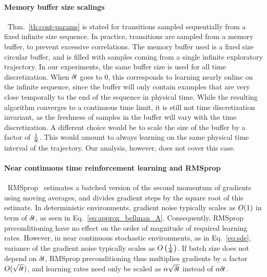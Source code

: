 \paragraph{Memory buffer size scalings}~Thm.~\ref{th:cont-params} is stated for
transitions sampled sequentially from a fixed infinite size sequence. In practice,
transitions are sampled from a memory buffer, to prevent excessive correlations.
The memory buffer used is a fixed size circular buffer, and is
filled with samples coming from a single infinite exploratory trajectory. In
our experiments, the same buffer size is used for all time discretization. When
${\delta\hspace{-.1em}t}$ goes to $0$, this corresponds to learning nearly online on the
infinite sequence, since the buffer will only contain examples that are very
close temporally to the end of the sequence in physical time. While the resulting
algorithm  converges to a continuous time limit, it is still not
time discretization invariant, as the freshness of samples in the buffer will
vary with the time discretization.
A different choice would be to scale the size of the buffer by a factor of
$\frac{1}{{\delta\hspace{-.1em}t}}$. This would amount to always learning on the same physical time interval of
the trajectory. Our analysis, however, does not cover this case.

\paragraph{Near continuous time reinforcement learning and RMSprop}~RMSprop~\cite{rmsprop}
estimates a batched version of the second momentum of gradients using moving
averages, and divides gradient steps by the square root of this estimate. In
deterministic environments, gradient noise typically scales as $O(1)$ in
term of ${\delta\hspace{-.1em}t}$, as seen in Eq.~\eqref{eq:approx_bellman_A}.  Consequently, RMSprop
preconditioning have no effect on the order of magnitude of required learning
rates. However, in near continuous stochastic environments, as in
Eq.~\ref{eq:sde}, variance of the gradient noise typically scales as
$O\left(\frac{1}{{\delta\hspace{-.1em}t}}\right)$. If batch size does not depend on
${\delta\hspace{-.1em}t}$, RMSprop preconditioning thus multiplies gradients by a factor $O(\sqrt{{\delta\hspace{-.1em}t}})$,
and learning rates need only be scaled as $\alpha \sqrt{{\delta\hspace{-.1em}t}}$ instead of
$\alpha {\delta\hspace{-.1em}t}$.
